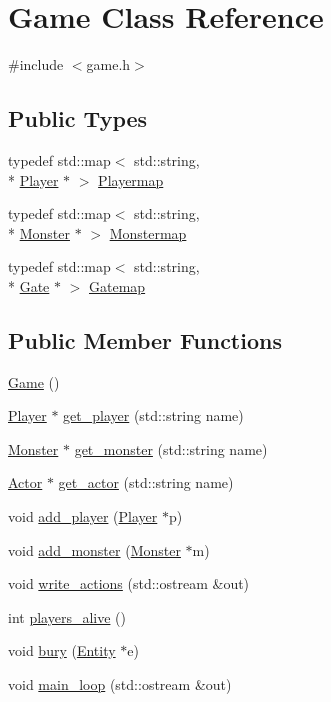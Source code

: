 \hypertarget{class_game}{\section{Game Class Reference}
\label{class_game}
}


{\ttfamily \#include $<$game.\-h$>$}

\subsection*{Public Types}
\begin{DoxyCompactItemize}
\item 
typedef std\-::map$<$ std\-::string, \\*
\hyperlink{class_player}{Player} $\ast$ $>$ \hyperlink{class_game_a11e553861e3a7fc842680e55171ed06f}{Playermap}
\item 
typedef std\-::map$<$ std\-::string, \\*
\hyperlink{class_monster}{Monster} $\ast$ $>$ \hyperlink{class_game_a2c39481e575abd66baa206771c504149}{Monstermap}
\item 
typedef std\-::map$<$ std\-::string, \\*
\hyperlink{class_gate}{Gate} $\ast$ $>$ \hyperlink{class_game_a3ac788aaa1e70509a9b9745acd17a8b5}{Gatemap}
\end{DoxyCompactItemize}
\subsection*{Public Member Functions}
\begin{DoxyCompactItemize}
\item 
\hyperlink{class_game_ad59df6562a58a614fda24622d3715b65}{Game} ()
\item 
\hyperlink{class_player}{Player} $\ast$ \hyperlink{class_game_a1ba768153bfd50425bf834080e787991}{get\-\_\-player} (std\-::string name)
\item 
\hyperlink{class_monster}{Monster} $\ast$ \hyperlink{class_game_a7ec99a9ec7eae9083a124600ac5023b6}{get\-\_\-monster} (std\-::string name)
\item 
\hyperlink{class_actor}{Actor} $\ast$ \hyperlink{class_game_a58a569b16c5350c2139b16827b9787ed}{get\-\_\-actor} (std\-::string name)
\item 
void \hyperlink{class_game_a532e7897423e470019ada16917b457c2}{add\-\_\-player} (\hyperlink{class_player}{Player} $\ast$p)
\item 
void \hyperlink{class_game_a5b3ceb773fe5f462bb23679ed0482db1}{add\-\_\-monster} (\hyperlink{class_monster}{Monster} $\ast$m)
\item 
void \hyperlink{class_game_a73b72d3098c7c9a8d232b5fd4b1139ad}{write\-\_\-actions} (std\-::ostream \&out)
\item 
int \hyperlink{class_game_ad6165e671cd454ac4c2296f306d293eb}{players\-\_\-alive} ()
\item 
void \hyperlink{class_game_a1845d7f4c11f16a76e79f119f4077f17}{bury} (\hyperlink{class_entity}{Entity} $\ast$e)
\item 
void \hyperlink{class_game_ace7329584fe440ea6496ff553f1a0e59}{main\-\_\-loop} (std\-::ostream \&out)
\end{DoxyCompactItemize}
